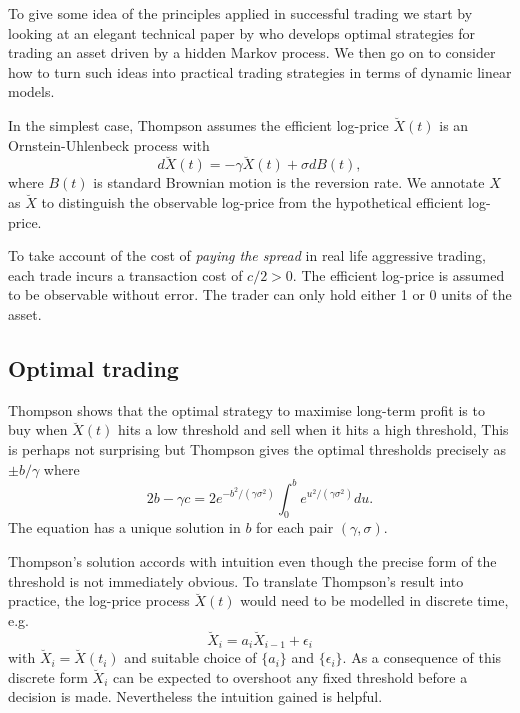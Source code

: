 To give some idea of the principles applied in successful trading we start by looking at an elegant technical paper by \citet{thompson2002optimal} who develops optimal strategies for trading an asset driven by a hidden Markov process.  We then go on to consider how to turn such ideas into practical trading strategies in terms of dynamic linear models. 

In the simplest case, Thompson assumes the efficient log-price $\breve{X}(t)$ is an Ornstein-Uhlenbeck process with
$$ d\breve{X}(t) = -\gamma \breve{X}(t) + \sigma dB(t),$$
where $B(t)$ is standard Brownian motion  is the reversion rate. We annotate $X$ as $\breve{X}$ to distinguish the observable log-price from the hypothetical efficient log-price.

To take account of the cost of \emph{paying the spread} in real life aggressive trading, each trade incurs a transaction cost of $c/2 > 0$. The efficient log-price is assumed to be observable without error. The trader can only hold either 1 or 0 units of the asset.

\subsection{Optimal trading}\label{sec:optimalTrading}
Thompson shows that the optimal strategy to maximise long-term profit is to buy when $\breve{X}(t)$ hits a low threshold and sell when it hits a high threshold, This is perhaps not surprising but Thompson gives the optimal thresholds precisely as $\pm b/\gamma$ where 
$$ 2b - \gamma c = 2 e^{-b^2/(\gamma \sigma^2)} \int _0 ^b e^{u^2/(\gamma \sigma^2)} du.$$
The equation has a unique solution in $b$ for each pair $(\gamma,\sigma)$.  

Thompson's solution accords with intuition even though the precise form of the threshold is not immediately obvious.  To translate Thompson's result into practice, the log-price process $\breve{X}(t)$ would need to be modelled in discrete time, e.g.\
$$ \breve{X}_i = a_i \breve{X}_{i-1} + \epsilon_i$$
with $\breve{X}_i = \breve{X}(t_i)$ and suitable choice of $\{a_i\}$ and $\{\epsilon_i\}$. As a consequence of this discrete form $\breve{X}_i$ can be expected to overshoot any fixed threshold before a decision is made. Nevertheless the intuition gained is helpful. 

